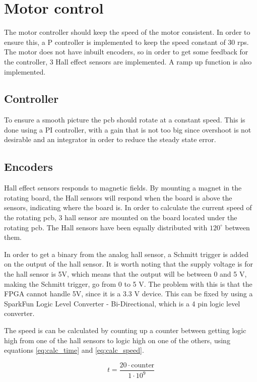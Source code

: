 \section{Motor control}
The motor controller should keep the speed of the motor consistent.
In order to ensure this, a P controller is implemented to keep the speed constant of 30 rps.
The motor does not have inbuilt encoders, so in order to get some feedback for the controller, 3 Hall effect sensors are implemented.
A ramp up function is also implemented.

\subsection{Controller}

To ensure a smooth picture the pcb should rotate at a constant speed.
This is done using a PI controller, with a gain that is not too big since overshoot is not desirable and an integrator in order to reduce the steady state error.

\subsection{Encoders} \label{sec:encoders}

Hall effect sensors responds to magnetic fields.
By mounting a magnet in the rotating board, the Hall sensors will respond when the board is above the sensors, indicating where the board is.
In order to calculate the current speed of the rotating pcb, 3 hall sensor are mounted on the board located under the rotating pcb.
The Hall sensors have been equally distributed with $120^{\circ}$ between them.

In order to get a binary from the analog hall sensor, a Schmitt trigger\cite[p. 655]{book:prac_ele} is added on the output of the hall sensor.
It is worth noting that the supply voltage is for the hall sensor is 5V, which means that the output will be between 0 and 5 V, making the Schmitt trigger, go from 0 to 5 V.
The problem with this is that the FPGA cannot handle 5V, since it is a 3.3 V device.
This can be fixed by using a SparkFun Logic Level Converter - Bi-Directional, which is a 4 pin logic level converter. 

The speed is can be calculated by counting up a counter between getting logic high from one of the hall sensors to  logic high on one of the others, using equations  \ref{eq:calc_time} and \ref{eq:calc_speed}.

\begin{equation} \label{eq:calc_time}
 t = \frac{20\cdot \text{counter}}{1\cdot 10^9}
\end{equation}

